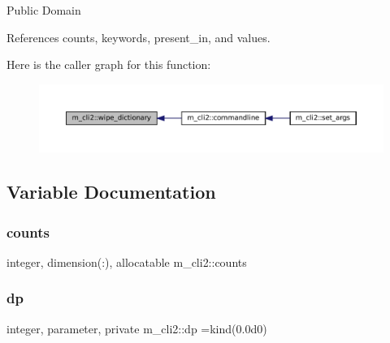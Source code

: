 Public Domain 

References counts, keywords, present\+\_\+in, and values.

Here is the caller graph for this function\+:\nopagebreak
\begin{figure}[H]
\begin{center}
\leavevmode
\includegraphics[width=350pt]{namespacem__cli2_ab1525b0419475486f520ef502daa5e94_icgraph}
\end{center}
\end{figure}


\subsection{Variable Documentation}
\mbox{\label{namespacem__cli2_abf81746a55c2218c7f2de15602bc0be8}} 
\subsubsection{\texorpdfstring{counts}{counts}}
{\footnotesize\ttfamily integer, dimension(\+:), allocatable m\+\_\+cli2\+::counts\hspace{0.3cm}{\ttfamily [private]}}

\mbox{\label{namespacem__cli2_acf83f1963cf6a56ad0221cfcf5402440}} 
\subsubsection{\texorpdfstring{dp}{dp}}
{\footnotesize\ttfamily integer, parameter, private m\+\_\+cli2\+::dp =kind(0.\+0d0)\hspace{0.3cm}{\ttfamily [private]}}

\mbox{\label{namespacem__cli2_a7f0b96691836126dc7f258a3da75b494}} 
